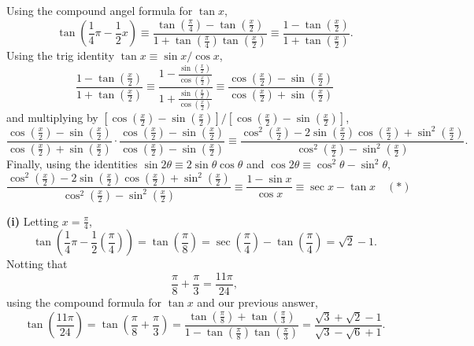 \documentclass{article}
\begin{document}
Using the compound angel formula for $\tan x$,
\[
\tan\left(\frac{1}{4}\pi - \frac{1}{2}x\right) \equiv \frac{\tan\left(\frac{\pi}{4}\right) - \tan\left(\frac{x}{2}\right)}{1+\tan\left(\frac{\pi}{4}\right)\tan\left(\frac{x}{2}\right)} \equiv \frac{1 - \tan\left(\frac{x}{2}\right)}{1+\tan\left(\frac{x}{2}\right)}.
\]
Using the trig identity $\tan x \equiv \sin x / \cos x$,
\[
\frac{1 - \tan\left(\frac{x}{2}\right)}{1+\tan\left(\frac{x}{2}\right)} \equiv \frac{1- \frac{\sin\left(\frac{x}{2}\right)}{\cos\left(\frac{x}{2}\right)}}{1+ \frac{\sin\left(\frac{x}{2}\right)}{\cos\left(\frac{x}{2}\right)}} \equiv \frac{\cos\left(\frac{x}{2}\right) - \sin\left(\frac{x}{2}\right)}{\cos\left(\frac{x}{2}\right) + \sin\left(\frac{x}{2}\right)}
\]
and multiplying by $[\cos\left(\frac{x}{2}\right) - \sin\left(\frac{x}{2}\right)] / [\cos\left(\frac{x}{2}\right) - \sin\left(\frac{x}{2}\right)]$,
\[
\frac{\cos\left(\frac{x}{2}\right) - \sin\left(\frac{x}{2}\right)}{\cos\left(\frac{x}{2}\right) + \sin\left(\frac{x}{2}\right)} \cdot \frac{\cos\left(\frac{x}{2}\right) - \sin\left(\frac{x}{2}\right)}{\cos\left(\frac{x}{2}\right) - \sin\left(\frac{x}{2}\right)} \equiv \frac{\cos^2\left(\frac{x}{2}\right) - 2\sin\left(\frac{x}{2}\right)\cos\left(\frac{x}{2}\right) + \sin^2\left(\frac{x}{2}\right)}{\cos^2\left(\frac{x}{2}\right)-\sin^2\left(\frac{x}{2}\right)}.
\]
Finally, using the identities $\sin 2 \theta \equiv 2\sin \theta \cos \theta$ and $\cos 2\theta \equiv \cos^2 \theta - \sin^2 \theta$,
\[
\frac{\cos^2\left(\frac{x}{2}\right) - 2\sin\left(\frac{x}{2}\right)\cos\left(\frac{x}{2}\right) + \sin^2\left(\frac{x}{2}\right)}{\cos^2\left(\frac{x}{2}\right)-\sin^2\left(\frac{x}{2}\right)} \equiv \frac{1-\sin x}{\cos x } \equiv \sec x - \tan x \quad (*)
\]

\vspace{0.5cm}

\textbf{(i)} Letting $x = \frac{\pi}{4}$,
\[
\tan\left(\frac{1}{4}\pi - \frac{1}{2}\left(\frac{\pi}{4}\right)\right)= \tan\left(\frac{\pi}{8}\right) =\sec\left(\frac{\pi}{4}\right) - \tan\left(\frac{\pi}{4}\right) = \sqrt{2} - 1.
\]
Notting that
\[
\frac{\pi}{8} + \frac{\pi}{3} = \frac{11\pi}{24},
\]
using the compound formula for $\tan x$ and our previous answer,
\[
\tan\left(\frac{11\pi}{24}\right) = \tan\left(\frac{\pi}{8} + \frac{\pi}{3}\right) = \frac{\tan\left(\frac{\pi}{8}\right) + \tan\left(\frac{\pi}{3}\right)}{1 - \tan\left(\frac{\pi}{8}\right)\tan\left(\frac{\pi}{3}\right)} = \frac{\sqrt{3} + \sqrt{2} -1}{\sqrt{3} - \sqrt{6} + 1}.
\]

\vspace{0.5cm}
\end{document}
